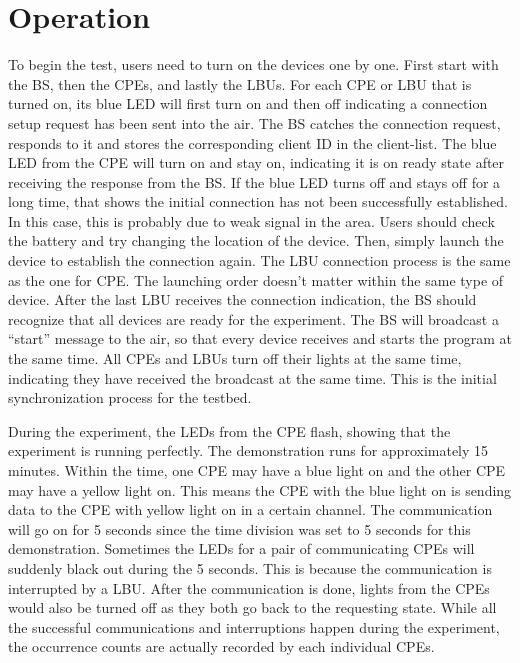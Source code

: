 \section{Operation}

To begin the test, users need to turn on the devices one by one. First start with the BS, then the CPEs, and lastly the LBUs. For each CPE or LBU that is turned on, its blue LED will  first turn on and then off indicating a connection setup request has been sent into the air. The BS catches the connection request, responds to it and stores the corresponding client ID in the client-list. The blue LED from the CPE will turn on and stay on, indicating it is on ready state after receiving the response from the BS. If the blue LED turns off and stays off for a long time, that shows the initial connection has not been successfully established. In this case, this is probably due to weak signal in the area. Users should check the battery and try changing the location of the device. Then, simply launch the device to establish the connection again. The LBU connection process is the same as the one for CPE. The launching order doesn't matter within the same type of device. After the last LBU receives the connection indication, the BS should recognize that all devices are ready for the experiment. The BS will broadcast a ``start'' message to the air, so that every device receives and starts the program at the same time. All CPEs and LBUs turn off their lights at the same time, indicating they have received the broadcast at the same time. This is the initial synchronization process for the testbed.

During the experiment, the LEDs from the CPE flash, showing that the experiment is running perfectly. The demonstration runs for approximately 15 minutes. Within the time, one CPE may have a blue light on and the other CPE may have a yellow light on. This means the CPE with the blue light on is sending data to the CPE with yellow light on in a certain channel. The communication will go on for 5 seconds since the time division was set to 5 seconds for this demonstration. Sometimes the LEDs for a pair of communicating CPEs will suddenly black out during the 5 seconds. This is because the communication is interrupted by a LBU. After the communication is done, lights from the CPEs would also be turned off as they both go back to the requesting state. While all the successful communications and interruptions happen during the experiment, the occurrence counts are actually recorded by each individual CPEs. 

